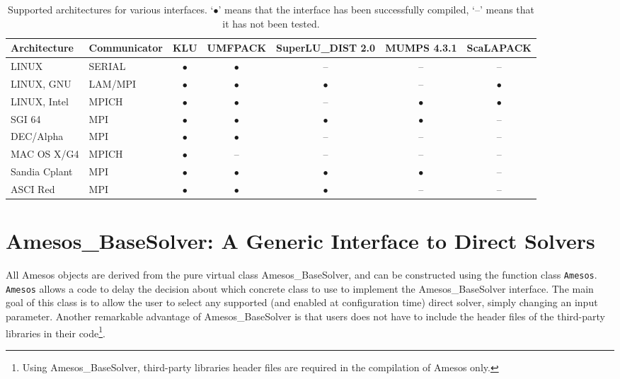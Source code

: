 \documentclass[11pt]{SANDreport}
\begin{document}
\begin{sidewaystable}[tbhp]
  \centering
  \begin{tabular}{| l  l | c | c | c | c | c | }
    \hline
    Architecture & Communicator & KLU & UMFPACK & SuperLU\_DIST 2.0 &
    MUMPS 4.3.1 & ScaLAPACK    \\
    \hline
    LINUX & SERIAL & $\bullet$ & $\bullet$ & -- & -- & -- \\
    LINUX, GNU & LAM/MPI  &$\bullet$  & $\bullet$ & $\bullet$
    & -- & $\bullet$ \\
    LINUX, Intel & MPICH  &$\bullet$  & $\bullet$ & -- 
    & $\bullet$ & $\bullet$ \\
    SGI 64 & MPI & $\bullet$ & $\bullet$ & $\bullet$ & $\bullet$ & -- \\
    DEC/Alpha & MPI & $\bullet$ & $\bullet$ & -- & -- & -- \\
    MAC OS X/G4 & MPICH & $\bullet$ & -- & -- & -- & -- \\
    Sandia Cplant & MPI & $\bullet$ & $\bullet$ & $\bullet$ & $\bullet$ & -- \\
    ASCI Red & MPI & $\bullet$ & $\bullet$ & $\bullet$ & -- & -- \\
    \hline
  \end{tabular}
  \caption{Supported architectures for various interfaces. 
  `$\bullet$' means that the interface has been successfully compiled, 
  `--' means that it has not been tested.}
  \label{tab:arch}
\end{sidewaystable}


\section{Amesos\_BaseSolver: A Generic Interface to Direct Solvers}
\label{sec:amesos_generic}

All Amesos objects are derived from the pure virtual class
Amesos\_BaseSolver, and can be constructed using the function class
\verb!Amesos!.  \verb!Amesos! allows a code to delay the decision about
which concrete class to use to implement the Amesos\_BaseSolver
interface. The main goal of this class is to allow the user to select
any supported (and enabled at configuration time) direct solver, simply
changing an input parameter. Another remarkable advantage of
Amesos\_BaseSolver is that users does not have to include the header
files of the third-party libraries in their code\footnote{Using
  Amesos\_BaseSolver, third-party libraries header files are required in
  the compilation of Amesos only.}.
\end{document}
